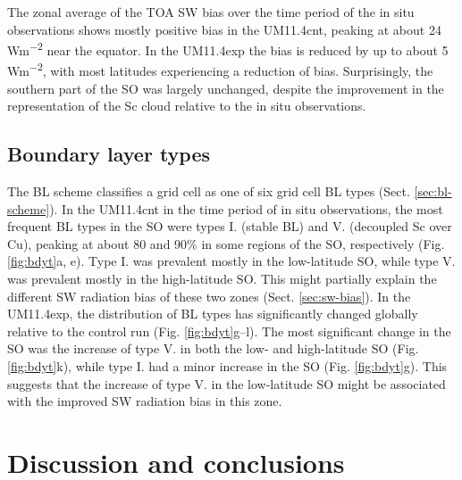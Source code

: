The zonal average of the TOA SW bias over the time period of the in situ
observations shows mostly positive bias in the
UM11.4cnt, peaking at about 24 \unit{Wm^{-2}} near the equator. In the
UM11.4exp the bias is reduced by up to about 5 \unit{Wm^{-2}}, with most
latitudes experiencing a reduction of bias. Surprisingly, the southern
part of the SO was largely unchanged, despite the improvement in the
representation of the Sc cloud relative to the in situ observations.

\subsection{Boundary layer types}
\label{sec:bl-types}

The BL scheme classifies a grid cell as one of six grid cell BL types
(Sect. \ref{sec:bl-scheme}). In the UM11.4cnt in the time period of in situ observations,
the most frequent BL types in the SO were types I. (stable BL) and V. (decoupled Sc
over Cu), peaking at about 80 and 90\% in some regions of the SO, respectively
(Fig. \ref{fig:bdyt}a, e).
Type I. was prevalent mostly in the low-latitude SO, while type V. was
prevalent mostly in the high-latitude SO. This might partially explain
the different SW radiation bias of these two zones (Sect. \ref{sec:sw-bias}).
In the UM11.4exp, the distribution of BL types has significantly changed
globally relative to the control run (Fig. \ref{fig:bdyt}g--l). The most significant change in the SO
was the increase of type V. in both the low- and high-latitude SO (Fig.
\ref{fig:bdyt}k), while type I. had a minor increase in the SO (Fig.
\ref{fig:bdyt}g). This suggests that the increase of type V. in the low-latitude
SO might be associated with the improved SW radiation bias in this zone.

\section{Discussion and conclusions}


